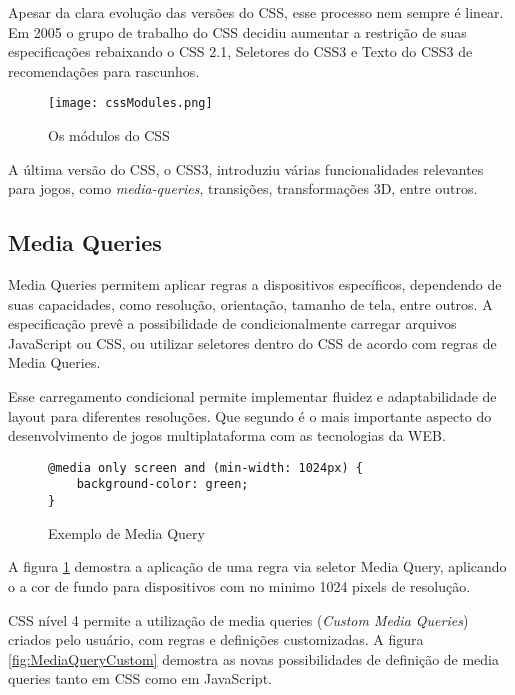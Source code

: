 Apesar da clara evolução das versões do CSS, esse processo nem
sempre é linear. Em 2005 o grupo de trabalho do CSS decidiu aumentar a
restrição de suas especificações rebaixando o CSS 2.1, Seletores do
CSS3 e Texto do CSS3 de recomendações para rascunhos.

\begin{figure}
    \centering
    \texttt{[image: cssModules.png]}
    \caption{Os módulos do CSS}
\end{figure}

A última versão do CSS, o CSS3, introduziu várias funcionalidades
relevantes para jogos, como \textit{media-queries}, transições,
transformações 3D, entre outros.

\subsection{Media Queries}

Media Queries permitem aplicar regras a dispositivos específicos,
dependendo de suas capacidades, como resolução, orientação, tamanho
de tela, entre outros. A especificação prevê a possibilidade de
condicionalmente carregar arquivos JavaScript ou CSS, ou utilizar
seletores dentro do CSS de acordo com regras de Media Queries.

Esse carregamento condicional  permite implementar fluidez e
adaptabilidade de layout para diferentes resoluções. Que segundo
\cite{HTML5CrossPlatformGameDevelopment} é o mais importante aspecto do
desenvolvimento de jogos multiplataforma com as tecnologias da WEB.

\begin{figure}
\centering
\begin{verbatim}
@media only screen and (min-width: 1024px) {
    background-color: green;
}
\end{verbatim}
\caption{Exemplo de Media Query}
\label{fig:MediaQuery}
\end{figure}

A figura \ref{fig:MediaQuery} demostra a aplicação de uma regra via
seletor Media Query, aplicando o a cor de fundo para dispositivos com no
minimo 1024 pixels de resolução.

CSS nível 4 permite a utilização de media queries (\textit{Custom
Media Queries}) criados pelo usuário, com regras e definições
customizadas. A figura \ref{fig:MediaQueryCustom} demostra as novas
possibilidades de definição de media queries tanto em CSS como em
JavaScript.

